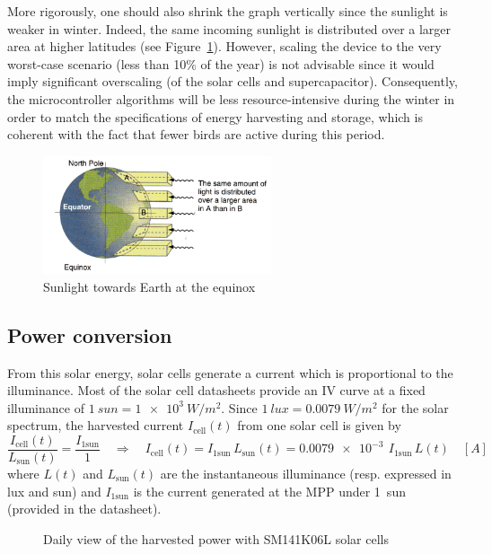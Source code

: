 \documentclass{EPL-master-thesis-covers-EN}
\newcommand{\te}[1]{\textrm{#1}}
\begin{document}
More rigorously, one should also shrink the graph vertically since the sunlight is weaker in winter. Indeed, the same incoming sunlight is distributed over a larger area at higher latitudes (see Figure~\ref{fig:sunlight_png}). However, scaling the device to the very worst-case scenario (less than 10\% of the year) is not advisable since it would imply significant overscaling (of the solar cells and supercapacitor). Consequently, the microcontroller algorithms will be less resource-intensive during the winter in order to match the specifications of energy harvesting and storage, which is coherent with the fact that fewer birds are active during this period.

\begin{figure}[H]
    \centering
    \includegraphics[width=0.6\textwidth]{sunlight.png}
    \caption[Sunlight towards Earth at the equinox]{Sunlight towards Earth at the equinox~\cite{ackerman2007meteorology}}
    \label{fig:sunlight_png}
\end{figure}


\subsection*{Power conversion}

From this solar energy, solar cells generate a current which is proportional to the illuminance. Most of the solar cell datasheets provide an IV curve at a fixed illuminance of $\SI{1}{sun} = \SI{1e3}{W/m^2}$. Since $\SI{1}{lux} = \SI{0.0079}{W/m^2}$ for the solar spectrum, the harvested current $I_\te{cell}(t)$ from one solar cell is given by
\[
  \frac{I_\te{cell}(t)}{L_\te{sun}(t)} = \frac{I_{1\te{sun}}}{1} \quad \Rightarrow \quad I_\te{cell}(t) = I_{1\te{sun}}\,L_\te{sun}(t) = \SI{0.0079e-3}{}\,I_{1\te{sun}}\,L(t) \quad \si{[A]}
\]
where $L(t)$ and $L_{\te{sun}}(t)$ are the instantaneous illuminance (resp. expressed in lux and sun) and $I_{1\te{sun}}$ is the current generated at the MPP under \SI{1}{sun} (provided in the datasheet).

\begin{figure}[H]
    \centering
    
    \caption{Daily view of the harvested power with SM141K06L solar cells}
    \label{fig:P_cell}
\end{figure}
\end{document}
